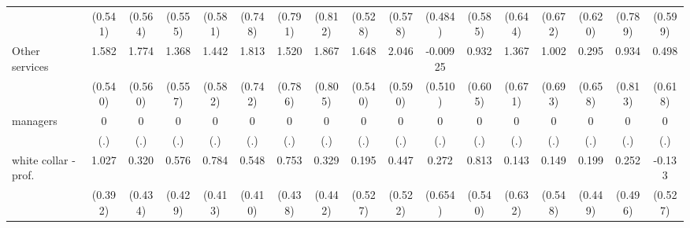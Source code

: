 {\begin{tabular}{l*{16}{c}}
                    &     (0.541)         &     (0.564)         &     (0.555)         &     (0.581)         &     (0.748)         &     (0.791)         &     (0.812)         &     (0.528)         &     (0.578)         &     (0.484)         &     (0.585)         &     (0.644)         &     (0.672)         &     (0.620)         &     (0.789)         &     (0.599)         \\
[1em]
Other services      &       1.582\sym{**} &       1.774\sym{**} &       1.368\sym{*}  &       1.442\sym{*}  &       1.813\sym{*}  &       1.520         &       1.867\sym{*}  &       1.648\sym{**} &       2.046\sym{***}&    -0.00925         &       0.932         &       1.367\sym{*}  &       1.002         &       0.295         &       0.934         &       0.498         \\
                    &     (0.540)         &     (0.560)         &     (0.557)         &     (0.582)         &     (0.742)         &     (0.786)         &     (0.805)         &     (0.540)         &     (0.590)         &     (0.510)         &     (0.605)         &     (0.671)         &     (0.693)         &     (0.658)         &     (0.813)         &     (0.618)         \\
[1em]
managers            &           0         &           0         &           0         &           0         &           0         &           0         &           0         &           0         &           0         &           0         &           0         &           0         &           0         &           0         &           0         &           0         \\
                    &         (.)         &         (.)         &         (.)         &         (.)         &         (.)         &         (.)         &         (.)         &         (.)         &         (.)         &         (.)         &         (.)         &         (.)         &         (.)         &         (.)         &         (.)         &         (.)         \\
[1em]
white collar - prof.&       1.027\sym{**} &       0.320         &       0.576         &       0.784         &       0.548         &       0.753         &       0.329         &       0.195         &       0.447         &       0.272         &       0.813         &       0.143         &       0.149         &       0.199         &       0.252         &      -0.133         \\
                    &     (0.392)         &     (0.434)         &     (0.429)         &     (0.413)         &     (0.410)         &     (0.438)         &     (0.442)         &     (0.527)         &     (0.522)         &     (0.654)         &     (0.540)         &     (0.632)         &     (0.548)         &     (0.449)         &     (0.496)         &     (0.527)         \\

\end{tabular}}
